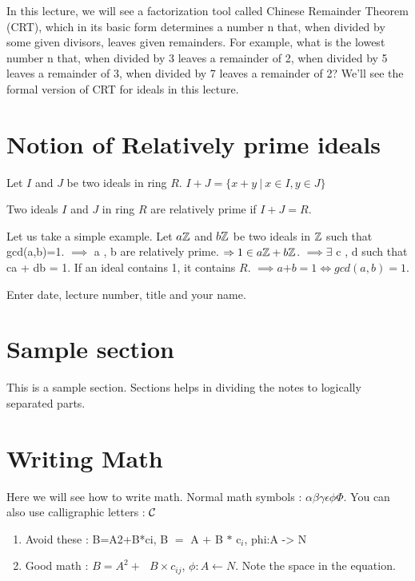 In this lecture, we will see a factorization tool called Chinese Remainder Theorem (CRT), which in its basic form determines a number n that, when divided by some given divisors, leaves given remainders. For example, what is the lowest number n that, when divided by 3 leaves a remainder of 2, when divided by 5 leaves a remainder of 3, when divided by 7 leaves a remainder of 2? We'll see the formal version of CRT for ideals in this lecture.

\section{Notion of Relatively prime ideals}
Let $I$ and $J$ be two ideals in ring $R$. $I + J = \{ x + y ~|~ x \in I , y \in J \}$
\begin{definition}
Two ideals $I$ and $J$ in ring $R$ are relatively prime if  $I + J = R$.
\end{definition}

Let us take a simple example. Let $a{\mathbb{Z}}$ and $b{\mathbb{Z}}$ be two ideals in ${\mathbb{Z}}$ such that gcd(a,b)=1. $\implies$ a , b are relatively prime.  $\Rightarrow 1 \in a{\mathbb{Z}} +  b{\mathbb{Z}} $.  $\implies \exists$ c , d such that ca + db = 1. If an ideal contains 1, it contains $R$. \newline $\implies a$\Z$ + b$\Z$ = 1 \iff gcd(a,b) = 1. $

\begin{note}
	Enter date, lecture number, title and your name. 
\end{note}

\section{Sample section}
This is a sample section. Sections helps in dividing the notes to logically separated parts.


\section{Writing Math}
Here we will see how to write math. Normal math symbols : 
$\alpha\beta\gamma\epsilon\phi\Phi $. You can also use calligraphic letters : ${\cal C}$
\begin{enumerate}
\item Avoid these : B=A2+B*ci, B $=$ A $+$ B $*$ c$_i$, phi:A -> N
\item Good math : $B=A^2 +~~~B \times c_{ij}$, $\phi: A \leftarrow N$. Note the space in the equation.
\end{enumerate}



